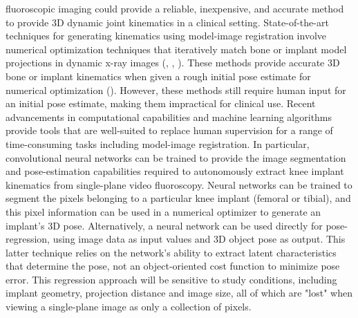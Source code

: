 fluoroscopic imaging could provide a reliable, inexpensive, and accurate method to provide 3D dynamic joint kinematics in a clinical setting.
State-of-the-art techniques for generating kinematics using model-image registration involve numerical optimization techniques that iteratively match bone or implant model projections in dynamic x-ray images (\cite{postolkaEvaluationIntensitybasedAlgorithm2020}, \cite{floodAutomatedRegistration3D2018}, \cite{tsaiVolumetricModelbased2D2010}). These methods provide accurate 3D bone or implant kinematics when given a rough initial pose estimate for numerical optimization (\cite{floodAutomatedRegistration3D2018}). However, these methods still require human input for an initial pose estimate, making them impractical for clinical use. 
Recent advancements in computational capabilities and machine learning algorithms provide tools that are well-suited to replace human supervision for a range of time-consuming tasks including model-image registration. In particular, convolutional neural networks can be trained to provide the image segmentation and pose-estimation capabilities required to autonomously extract knee implant kinematics from single-plane video fluoroscopy. Neural networks can be trained to segment the pixels belonging to a particular knee implant (femoral or tibial), and this pixel information can be used in a numerical optimizer to generate an implant's 3D pose. Alternatively, a neural network can be used directly for pose-regression, using image data as input values and 3D object pose as output. This latter technique relies on the network's ability to extract latent characteristics that determine the pose, not an object-oriented cost function to minimize pose error. This regression approach will be sensitive to study conditions, including implant geometry, projection distance and image size, all of which are "lost" when viewing a single-plane image as only a collection of pixels. 



